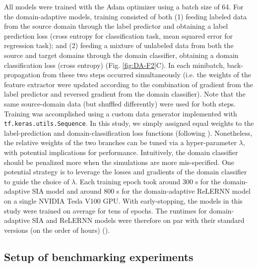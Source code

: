 All models were trained with the Adam optimizer using a batch size of 64. For the domain-adaptive models, training consisted of both (1) feeding labeled data from the source domain through the label predictor and obtaining a label prediction loss (cross entropy for classification task, mean squared error for regression task); and (2) feeding a mixture of unlabeled data from both the source and target domains through the domain classifier, obtaining a domain classification loss (cross entropy) (Fig. \ref{fig:DA-F2}C). In each minibatch, back-propagation from these two steps occurred simultaneously (i.e. the weights of the feature extractor were updated according to the combination of gradient from the label predictor and reversed gradient from the domain classifier). Note that the same source-domain data (but shuffled differently) were used for both steps. Training was accomplished using a custom data generator implemented with \texttt{tf.keras.utils.Sequence}. In this study, we simply assigned equal weights to the label-prediction and domain-classification loss functions (following \cite{ganin_unsupervised_2014}). Nonetheless, the relative weights of the two branches can be tuned via a hyper-parameter $\lambda$, with potential implications for performance. Intuitively, the domain classifier should be penalized more when the simulations are more mis-specified. One potential strategy is to leverage the losses and gradients of the domain classifier to guide the choice of $\lambda$. Each training epoch took around 300 s for the domain-adaptive \ac{SIA} model and around 800 s for the domain-adaptive ReLERNN model on a single NVIDIA Tesla V100 GPU. With early-stopping, the models in this study were trained on average for tens of epochs. The runtimes for domain-adaptive \ac{SIA} and ReLERNN models were therefore on par with their standard versions (on the order of hours) (\cite{adrion_predicting_2020,hejase_deep-learning_2022}).

\subsection{Setup of benchmarking experiments}

